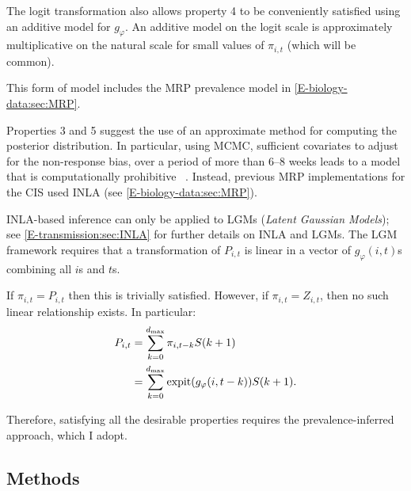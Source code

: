 \documentclass[thesis.tex]{subfiles}
\begin{document}
The logit transformation also allows property 4 to be conveniently satisfied using an additive model for $g_\varphi$.
An additive model on the logit scale is approximately multiplicative on the natural scale for small values of $\pi_{i,t}$ (which will be common).

This form of model includes the MRP prevalence model in \cref{E-biology-data:sec:MRP}.




Properties 3 and 5 suggest the use of an approximate method for computing the posterior distribution.
In particular, using MCMC, sufficient covariates to adjust for the non-response bias, over a period of more than 6--8 weeks leads to a model that is computationally prohibitive ~.
Instead, previous MRP implementations for the CIS used INLA (see \cref{E-biology-data:sec:MRP}).

INLA-based inference can only be applied to LGMs (\emph{Latent Gaussian Models}); see \cref{E-transmission:sec:INLA} for further details on INLA and LGMs.
The LGM framework requires that a transformation of $P_{i,t}$ is linear in a vector of $g_{\varphi}(i, t)$s combining all $i$s and $t$s.

If $\pi_{i,t} = P_{i,t}$ then this is trivially satisfied.
However, if $\pi_{i,t} = Z_{i,t}$, then no such linear relationship exists.
In particular:
\begin{align}
    P_{i,t}
    &= \sum_{k=0}^{d_\text{max}} \pi_{i,t-k} S(k+1) \\
    &= \sum_{k=0}^{d_\text{max}} \operatorname{expit}(g_\varphi(i, t-k)) S(k+1).
\end{align}

Therefore, satisfying all the desirable properties requires the prevalence-inferred approach, which I adopt.

\subsection{Methods} \label{backcalc:sec:methods}
\end{document}
